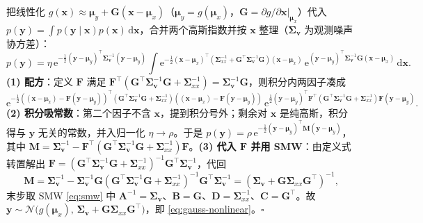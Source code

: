 \begin{derivation}\label{der:gauss-nonlinear-full}
把线性化 $g(\mathbf{x})\approx\boldsymbol{\mu}_y+\mathbf{G}(\mathbf{x}-\boldsymbol{\mu}_x)$（$\boldsymbol{\mu}_y=g(\boldsymbol{\mu}_x)$，$\mathbf{G}=\partial g/\partial\mathbf{x}|_{\boldsymbol{\mu}_x}$）代入 $p(\mathbf{y})=\int p(\mathbf{y}\mid\mathbf{x})p(\mathbf{x})\,\mathrm{d}\mathbf{x}$，合并两个高斯指数并按 $\mathbf{x}$ 整理（$\boldsymbol{\Sigma}_{\mathbf{v}}$ 为观测噪声协方差）：
\[
  p(\mathbf{y})=\eta\,\mathrm{e}^{-\frac12(\mathbf{y}-\boldsymbol{\mu}_y)^\top\boldsymbol{\Sigma}_{\mathbf{v}}^{-1}(\mathbf{y}-\boldsymbol{\mu}_y)}
  \!\int\!\mathrm{e}^{-\frac12(\mathbf{x}-\boldsymbol{\mu}_x)^\top(\boldsymbol{\Sigma}_{xx}^{-1}+\mathbf{G}^\top\boldsymbol{\Sigma}_{\mathbf{v}}^{-1}\mathbf{G})(\mathbf{x}-\boldsymbol{\mu}_x)}
  \,\mathrm{e}^{(\mathbf{y}-\boldsymbol{\mu}_y)^\top\boldsymbol{\Sigma}_{\mathbf{v}}^{-1}\mathbf{G}(\mathbf{x}-\boldsymbol{\mu}_x)}\,\mathrm{d}\mathbf{x}.
\]
\textbf{(1) 配方}：定义 $\mathbf{F}$ 满足 $\mathbf{F}^\top(\mathbf{G}^\top\boldsymbol{\Sigma}_{\mathbf{v}}^{-1}\mathbf{G}+\boldsymbol{\Sigma}_{xx}^{-1})=\boldsymbol{\Sigma}_{\mathbf{v}}^{-1}\mathbf{G}$，则积分内两因子凑成
\[
  \mathrm{e}^{-\frac12((\mathbf{x}-\boldsymbol{\mu}_x)-\mathbf{F}(\mathbf{y}-\boldsymbol{\mu}_y))^\top(\mathbf{G}^\top\boldsymbol{\Sigma}_{\mathbf{v}}^{-1}\mathbf{G}+\boldsymbol{\Sigma}_{xx}^{-1})((\mathbf{x}-\boldsymbol{\mu}_x)-\mathbf{F}(\mathbf{y}-\boldsymbol{\mu}_y))}\,
  \mathrm{e}^{\frac12(\mathbf{y}-\boldsymbol{\mu}_y)^\top\mathbf{F}^\top(\mathbf{G}^\top\boldsymbol{\Sigma}_{\mathbf{v}}^{-1}\mathbf{G}+\boldsymbol{\Sigma}_{xx}^{-1})\mathbf{F}(\mathbf{y}-\boldsymbol{\mu}_y)}.
\]
\textbf{(2) 积分吸常数}：第二个因子不含 $\mathbf{x}$，提到积分号外；剩余对 $\mathbf{x}$ 是纯高斯，积分得与 $\mathbf{y}$ 无关的常数，并入归一化 $\eta\to\rho$。于是 $p(\mathbf{y})=\rho\,\mathrm{e}^{-\frac12(\mathbf{y}-\boldsymbol{\mu}_y)^\top\mathbf{M}(\mathbf{y}-\boldsymbol{\mu}_y)}$，其中 $\mathbf{M}=\boldsymbol{\Sigma}_{\mathbf{v}}^{-1}-\mathbf{F}^\top(\mathbf{G}^\top\boldsymbol{\Sigma}_{\mathbf{v}}^{-1}\mathbf{G}+\boldsymbol{\Sigma}_{xx}^{-1})\mathbf{F}$。\textbf{(3) 代入 $\mathbf{F}$ 并用 SMW}：由定义式转置解出 $\mathbf{F}=(\mathbf{G}^\top\boldsymbol{\Sigma}_{\mathbf{v}}^{-1}\mathbf{G}+\boldsymbol{\Sigma}_{xx}^{-1})^{-1}\mathbf{G}^\top\boldsymbol{\Sigma}_{\mathbf{v}}^{-1}$，代回
\[
  \mathbf{M}=\boldsymbol{\Sigma}_{\mathbf{v}}^{-1}-\boldsymbol{\Sigma}_{\mathbf{v}}^{-1}\mathbf{G}(\mathbf{G}^\top\boldsymbol{\Sigma}_{\mathbf{v}}^{-1}\mathbf{G}+\boldsymbol{\Sigma}_{xx}^{-1})^{-1}\mathbf{G}^\top\boldsymbol{\Sigma}_{\mathbf{v}}^{-1}
  =(\boldsymbol{\Sigma}_{\mathbf{v}}+\mathbf{G}\boldsymbol{\Sigma}_{xx}\mathbf{G}^\top)^{-1},
\]
末步取 SMW \cref{eq:smw} 中 $\mathbf{A}^{-1}=\boldsymbol{\Sigma}_{\mathbf{v}}$、$\mathbf{B}=\mathbf{G}$、$\mathbf{D}=\boldsymbol{\Sigma}_{xx}^{-1}$、$\mathbf{C}=\mathbf{G}^\top$。故 $\mathbf{y}\sim\mathcal{N}\big(g(\boldsymbol{\mu}_x),\,\boldsymbol{\Sigma}_{\mathbf{v}}+\mathbf{G}\boldsymbol{\Sigma}_{xx}\mathbf{G}^\top\big)$，即 \cref{eq:gauss-nonlinear}。\hfill$\square$
\end{derivation}
